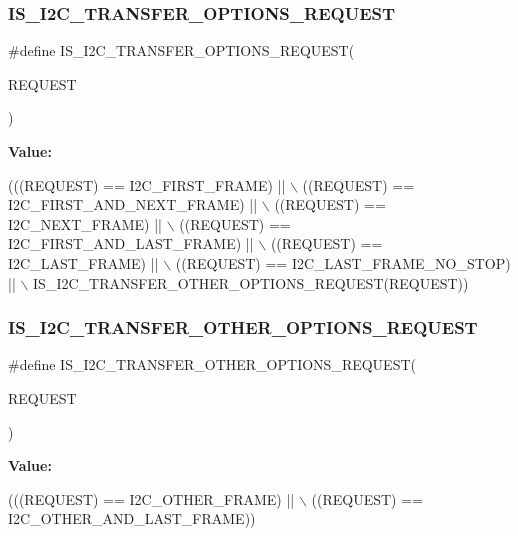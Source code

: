 \subsubsection{\texorpdfstring{I\+S\+\_\+\+I2\+C\+\_\+\+T\+R\+A\+N\+S\+F\+E\+R\+\_\+\+O\+P\+T\+I\+O\+N\+S\+\_\+\+R\+E\+Q\+U\+E\+ST}{IS\_I2C\_TRANSFER\_OPTIONS\_REQUEST}}
{\footnotesize\ttfamily \#define I\+S\+\_\+\+I2\+C\+\_\+\+T\+R\+A\+N\+S\+F\+E\+R\+\_\+\+O\+P\+T\+I\+O\+N\+S\+\_\+\+R\+E\+Q\+U\+E\+ST(\begin{DoxyParamCaption}\item[{}]{R\+E\+Q\+U\+E\+ST }\end{DoxyParamCaption})}

{\bfseries Value\+:}
\begin{DoxyCode}
(((REQUEST) == I2C\_FIRST\_FRAME)              || \(\backslash\)
                                                       ((REQUEST) == I2C\_FIRST\_AND\_NEXT\_FRAME)     || \(\backslash\)
                                                       ((REQUEST) == I2C\_NEXT\_FRAME)               || \(\backslash\)
                                                       ((REQUEST) == I2C\_FIRST\_AND\_LAST\_FRAME)     || \(\backslash\)
                                                       ((REQUEST) == I2C\_LAST\_FRAME)               || \(\backslash\)
                                                       ((REQUEST) == I2C\_LAST\_FRAME\_NO\_STOP)       || \(\backslash\)
                                                       IS\_I2C\_TRANSFER\_OTHER\_OPTIONS\_REQUEST(REQUEST))
\end{DoxyCode}
\mbox{\label{group___i2_c___i_s___r_t_c___definitions_ga13a3986011ca018dd12ff39ea3bec11b}} 
\subsubsection{\texorpdfstring{I\+S\+\_\+\+I2\+C\+\_\+\+T\+R\+A\+N\+S\+F\+E\+R\+\_\+\+O\+T\+H\+E\+R\+\_\+\+O\+P\+T\+I\+O\+N\+S\+\_\+\+R\+E\+Q\+U\+E\+ST}{IS\_I2C\_TRANSFER\_OTHER\_OPTIONS\_REQUEST}}
{\footnotesize\ttfamily \#define I\+S\+\_\+\+I2\+C\+\_\+\+T\+R\+A\+N\+S\+F\+E\+R\+\_\+\+O\+T\+H\+E\+R\+\_\+\+O\+P\+T\+I\+O\+N\+S\+\_\+\+R\+E\+Q\+U\+E\+ST(\begin{DoxyParamCaption}\item[{}]{R\+E\+Q\+U\+E\+ST }\end{DoxyParamCaption})}

{\bfseries Value\+:}
\begin{DoxyCode}
(((REQUEST) == I2C\_OTHER\_FRAME)     || \(\backslash\)
                                                        ((REQUEST) == I2C\_OTHER\_AND\_LAST\_FRAME))
\end{DoxyCode}
